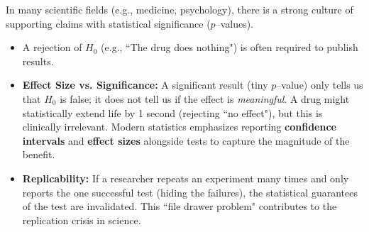 \begin{remark}
In many scientific fields (e.g., medicine, psychology), there is a strong culture of supporting claims with statistical significance (\(p\)--values).
\begin{itemize}
    \item A rejection of $H_0$ (e.g., ``The drug does nothing") is often required to publish results.
    \item \textbf{Effect Size vs. Significance:} A significant result (tiny \(p\)--value) only tells us that $H_0$ is false; it does not tell us if the effect is \emph{meaningful}. A drug might statistically extend life by 1 second (rejecting ``no effect"), but this is clinically irrelevant. Modern statistics emphasizes reporting \textbf{confidence intervals} and \textbf{effect sizes} alongside tests to capture the magnitude of the benefit.
    \item \textbf{Replicability:} If a researcher repeats an experiment many times and only reports the one successful test (hiding the failures), the statistical guarantees of the test are invalidated. This ``file drawer problem" contributes to the replication crisis in science.
\end{itemize}

\end{remark}

